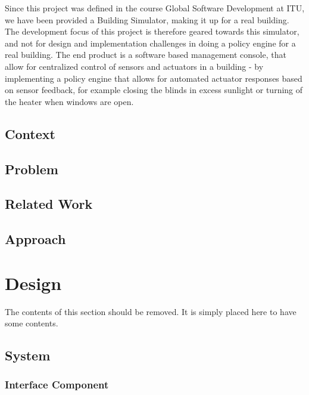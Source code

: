 \documentclass[11pt]{report}
\begin{document}
Since this project was defined in the course Global Software Development at ITU, we have been provided a Building Simulator, making it up for a real building. The development focus of this project is therefore geared towards this simulator, and not for design and implementation challenges in doing a policy engine for a real building. The end product is a software based management console, that allow for centralized control of sensors and actuators in a building - by implementing a policy engine that allows for automated actuator responses based on sensor feedback, for example closing the blinds in excess sunlight or turning of the heater when windows are open.
\section{Context}

\section{Problem}

\section{Related Work}

\section{Approach}


\chapter{Design}

The contents of this section should be removed. It is simply placed here to have some contents.

\section{System}

\subsection{Interface Component}
\end{document}
